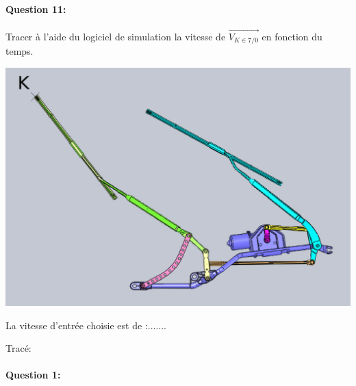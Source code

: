 \begin{minipage}{0.45\linewidth}
\paragraph{Question 11:} Tracer à l'aide du logiciel de simulation la vitesse de $\overrightarrow{V_{K\in 7/0}}$ en fonction du temps.

\end{minipage}
\hfill
\begin{minipage}{0.45\linewidth}
\includegraphics[width=0.9\linewidth]{img/essuie_glace_K}
\end{minipage}

\newpage

La vitesse d'entrée choisie est de :.......

Tracé:
\vspace{10cm}




\pagestyle{correction}\setcounter{section}{0}

\paragraph{Question 1:}
